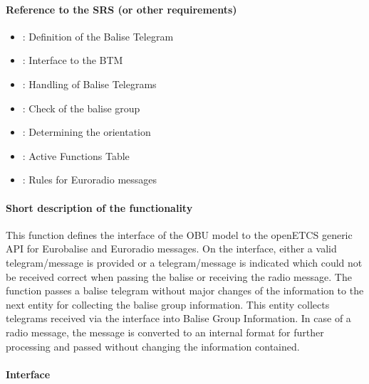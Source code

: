 \paragraph{Reference to the SRS (or other requirements)}
\begin{itemize}
  \item \cite[Chapt.~7 and 8]{subset-026}: Definition of the Balise Telegram
  \item \cite[Chapt.~4.2.2, 4.2.4, 4.2.9]{subset-036}: Interface to the BTM
  \item \cite[Chapt.~3.4.1 - 3.4.3, 3.16.2]{subset-026}: Handling of Balise Telegrams
  \item \cite[Chapt.~3.16.2]{subset-026}: Check of the balise group
  \item \cite[Chapt.~3.4.2]{subset-026}: Determining the orientation
  \item \cite[Chapt.~4.5.2]{subset-026}: Active Functions Table
  \item \cite[Chapt.~8.4.4]{subset-026}: Rules for Euroradio messages

\end{itemize}
\paragraph{Short description of the functionality}
This function defines the interface of the OBU model to the openETCS generic API for Eurobalise  and Euroradio messages. On the interface, either a valid telegram/message is provided or a telegram/message is indicated which could not be received correct when passing the balise or receiving the radio message. The function passes a balise telegram without major changes of the information to the next entity for collecting the balise group information. This entity collects telegrams received via the interface into Balise Group Information. In case of a radio message, the message is converted to an internal format for further processing and passed without changing the information contained.

\paragraph{Interface}
